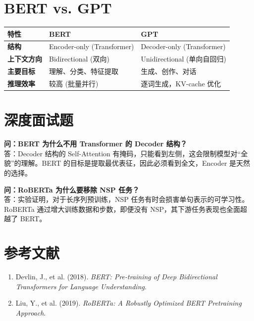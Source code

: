 \documentclass[12pt, a4paper]{article}
\begin{document}
\section{BERT vs. GPT}
\begin{table}[h]
\centering
\begin{tabularx}{\textwidth}{|l|X|X|}
\hline
\textbf{特性} & \textbf{BERT} & \textbf{GPT} \\
\hline
\textbf{结构} & Encoder-only (Transformer) & Decoder-only (Transformer) \\
\hline
\textbf{上下文方向} & Bidirectional (双向) & Unidirectional (单向自回归) \\
\hline
\textbf{主要目标} & 理解、分类、特征提取 & 生成、创作、对话 \\
\hline
\textbf{推理效率} & 较高 (批量并行) & 逐词生成，KV-cache 优化 \\
\hline
\end{tabularx}
\end{table}

\section{深度面试题}

\textbf{问：BERT 为什么不用 Transformer 的 Decoder 结构？}\\
答：Decoder 结构的 Self-Attention 有掩码，只能看到左侧，这会限制模型对“全貌”的理解。BERT 的目标是提取最优表征，因此必须看到全文，Encoder 是天然的选择。

\textbf{问：RoBERTa 为什么要移除 NSP 任务？}\\
答：实验证明，对于长序列预训练，NSP 任务有时会损害单句表示的可学习性。RoBERTa 通过增大训练数据和步数，即便没有 NSP，其下游任务表现也全面超越了 BERT。

\section{参考文献}
\begin{enumerate}
    \item Devlin, J., et al. (2018). \textit{BERT: Pre-training of Deep Bidirectional Transformers for Language Understanding}.
    \item Liu, Y., et al. (2019). \textit{RoBERTa: A Robustly Optimized BERT Pretraining Approach}.
\end{enumerate}
\end{document}
